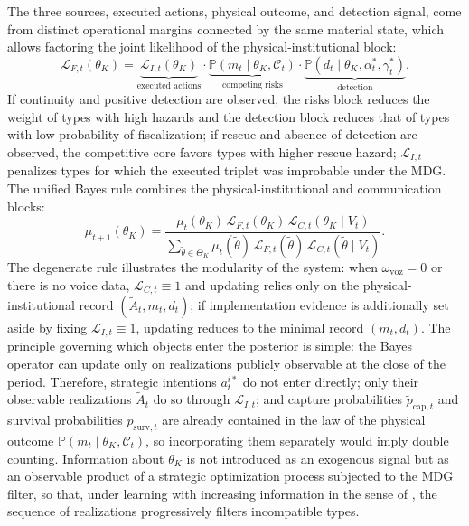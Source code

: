 \documentclass[ecta,nameyear,draft]{econsocart}
\theoremstyle{plain}
\theoremstyle{definition}
\newcommand{\Prob}{\mathbb{P}}
\newcommand{\ThetaK}{\Theta_K}
\newcommand{\1}{\mathbf{1}}
\begin{document}
The three sources, executed actions, physical outcome, and detection signal, come from distinct operational margins connected by the same material state, which allows factoring the joint likelihood of the physical-institutional block:
\begin{equation}
\mathcal{L}_{F,t}(\theta_K)=\underbrace{\mathcal{L}_{I,t}(\theta_K)}_{\text{executed actions}}\cdot\underbrace{\Prob(m_t\mid\theta_K,\mathcal{C}_t)}_{\text{competing risks}}\cdot\underbrace{\Prob(d_t\mid\theta_K,\alpha_t^\ast,\gamma_t^\ast)}_{\text{detection}}.
\label{eq:LF-joint}
\end{equation}
If continuity and positive detection are observed, the risks block reduces the weight of types with high hazards and the detection block reduces that of types with low probability of fiscalization; if rescue and absence of detection are observed, the competitive core favors types with higher rescue hazard; $\mathcal{L}_{I,t}$ penalizes types for which the executed triplet was improbable under the MDG. The unified Bayes rule combines the physical-institutional and communication blocks:
\begin{equation}
\mu_{t+1}(\theta_K)=\frac{\mu_t(\theta_K)\,\mathcal{L}_{F,t}(\theta_K)\,\mathcal{L}_{C,t}(\theta_K\mid V_t)}{\sum_{\tilde\theta\in\ThetaK}\mu_t(\tilde\theta)\,\mathcal{L}_{F,t}(\tilde\theta)\,\mathcal{L}_{C,t}(\tilde\theta\mid V_t)}.
\label{eq:bayes-update}
\end{equation}
The degenerate rule illustrates the modularity of the system: when $\omega_{\mathrm{voz}}=0$ or there is no voice data, $\mathcal{L}_{C,t}\equiv 1$ and updating relies only on the physical-institutional record $(\tilde{A}_t,m_t,d_t)$; if implementation evidence is additionally set aside by fixing $\mathcal{L}_{I,t}\equiv 1$, updating reduces to the minimal record $(m_t,d_t)$. The principle governing which objects enter the posterior is simple: the Bayes operator can update only on realizations publicly observable at the close of the period. Therefore, strategic intentions $a_t^{i\ast}$ do not enter directly; only their observable realizations $\tilde{A}_t$ do so through $\mathcal{L}_{I,t}$; and capture probabilities $\tilde{p}_{\mathrm{cap},t}$ and survival probabilities $p_{\mathrm{surv},t}$ are already contained in the law of the physical outcome $\Prob(m_t\mid\theta_K,\mathcal{C}_t)$, so incorporating them separately would imply double counting. Information about $\theta_K$ is not introduced as an exogenous signal but as an observable product of a strategic optimization process subjected to the MDG filter, so that, under learning with increasing information in the sense of \citet{BlackwellDubins1962}, the sequence of realizations progressively filters incompatible types.
\end{document}
